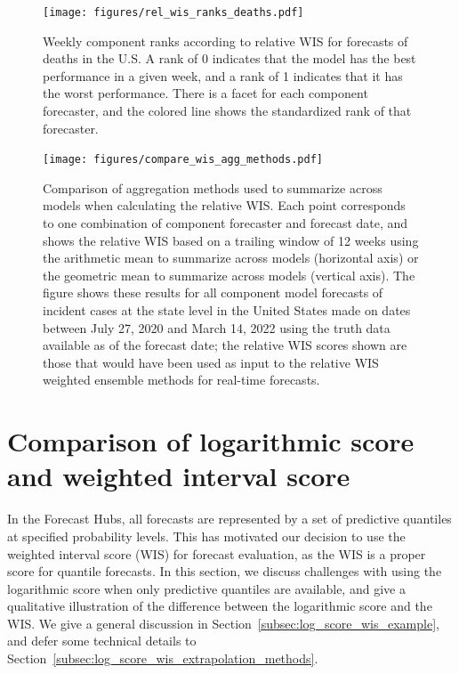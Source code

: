 \documentclass{article}
\begin{document}
\begin{figure}[H]
    \centering
    \texttt{[image: figures/rel\_wis\_ranks\_deaths.pdf]}
    \caption{Weekly component ranks according to relative WIS for forecasts of deaths in the U.S. A rank of 0 indicates that the model has the best performance in a given week, and a rank of 1 indicates that it has the worst performance. There is a facet for each component forecaster, and the colored line shows the standardized rank of that forecaster.}
    \label{fig:rel_wis_ranks_deaths}
\end{figure}

\begin{figure}[H]
    \centering
    \texttt{[image: figures/compare\_wis\_agg\_methods.pdf]}
    \caption{Comparison of aggregation methods used to summarize across models when calculating the relative WIS. Each point corresponds to one combination of component forecaster and forecast date, and shows the relative WIS based on a trailing window of 12 weeks using the arithmetic mean to summarize across models (horizontal axis) or the geometric mean to summarize across models (vertical axis). The figure shows these results for all component model forecasts of incident cases at the state level in the United States made on dates between July 27, 2020 and March 14, 2022 using the truth data available as of the forecast date; the relative WIS scores shown are those that would have been used as input to the relative WIS weighted ensemble methods for real-time forecasts.}
    \label{fig:compare_rel_wis_agg_methods}
\end{figure}

\newpage

\section{Comparison of logarithmic score and weighted interval score}

In the Forecast Hubs, all forecasts are represented by a set of predictive quantiles at specified probability levels. This has motivated our decision to use the weighted interval score (WIS) for forecast evaluation, as the WIS is a proper score for quantile forecasts. In this section, we discuss challenges with using the logarithmic score when only predictive quantiles are available, and give a qualitative illustration of the difference between the logarithmic score and the WIS. We give a general discussion in Section~\ref{subsec:log_score_wis_example}, and defer some technical details to Section~\ref{subsec:log_score_wis_extrapolation_methods}.
\end{document}
